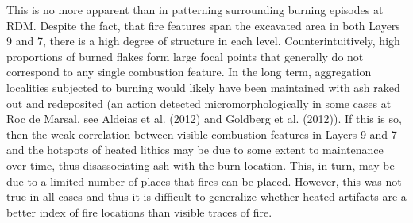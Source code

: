 \documentclass[smallextended]{svjour3}       %
\begin{document}
This is no more apparent than in patterning surrounding burning episodes
at RDM. Despite the fact, that fire features span the excavated area in
both Layers 9 and 7, there is a high degree of structure in each level.
Counterintuitively, high proportions of burned flakes form large focal
points that generally do not correspond to any single combustion
feature. In the long term, aggregation localities subjected to burning
would likely have been maintained with ash raked out and redeposited (an
action detected micromorphologically in some cases at Roc de Marsal, see
Aldeias et al. (2012) and Goldberg et al. (2012)). If this is so, then
the weak correlation between visible combustion features in Layers 9 and
7 and the hotspots of heated lithics may be due to some extent to
maintenance over time, thus disassociating ash with the burn location.
This, in turn, may be due to a limited number of places that fires can
be placed. However, this was not true in all cases and thus it is
difficult to generalize whether heated artifacts are a better index of
fire locations than visible traces of fire.
\end{document}
